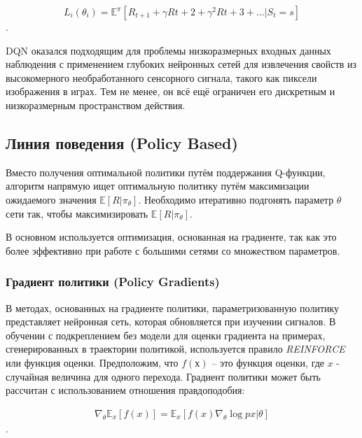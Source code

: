 \begin{equation} \label{eq:someEq}
L_i(\theta_i) = \mathbb{E}^\pi [R_{t+1} + \gamma R{t+2} + \gamma^2 R{t+3} + ... |S_t = s]
\end{equation}.


DQN оказался подходящим для проблемы низкоразмерных входных данных наблюдения с применением глубоких нейронных сетей для извлечения свойств из высокомерного необработанного сенсорного сигнала, такого как пиксели изображения в играх. Тем не менее, он всё ещё ограничен его дискретным и низкоразмерным пространством действия.

\subsection{Линия поведения (Policy Based)}

Вместо получения оптимальной политики путём поддержания Q-функции, алгоритм напрямую ищет оптимальную политику путём максимизации ожидаемого значения $\mathbb{E}[R|\pi_\theta]$. Необходимо итеративно подгонять параметр $\theta$ сети так, чтобы максимизировать $\mathbb{E}[R|\pi_\theta]$.

В основном используется оптимизация, основанная на градиенте, так как это более эффективно при работе с большими сетями со множеством параметров. \cite{Arulkumaran_2017}

\subsubsection{Градиент политики (Policy Gradients)}

В методах, основанных на градиенте политики, параметризованную политику представляет нейронная сеть, которая обновляется при изучении сигналов. В обучении с подкреплением без модели для оценки градиента на примерах, сгенерированных в траектории политикой, используется правило {\itshape REINFORCE} или функция оценки. Предположим, что $f(х)$ – это функция оценки, где $x$ - случайная величина для одного перехода. Градиент политики может быть рассчитан с использованием отношения правдоподобия:

\begin{equation}
	\label{eq:ch1-likelihood-ratios}
	\begin{multlined}
		\nabla_\theta \mathbb{E}_x[f(x)] = \mathbb{E}_x[f(x) \nabla_\theta \log p x|\theta]
	\end{multlined}
\end{equation}.

